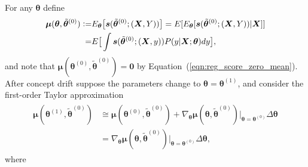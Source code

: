 \documentclass[twoside,11pt]{article}
\begin{document}
For any $\bm { \theta}$ define 
\begin{align}
\begin{aligned}
\bm{\mu}(\bm { \theta}, \tilde{ \bm { \theta}} ^{ (0)}) \vcentcolon=& E _{\bm { \theta}} \big[ \bm{s} (\tilde{ \bm { \theta}} ^{ (0)}; (\bm{X},Y) ) \big] = E[E _{\bm { \theta}}[\bm{s}(\tilde{\bm { \theta}}^{ (0)}; (\bm {X}, Y))| \bm {X}] ] \\
=& E\big[\int \bm{s}(\tilde{\bm { \theta}}^{ (0)}; (\bm {X}, y)) P(y | \bm {X}; \bm{\theta}) dy \big], 
\end{aligned}
\label{eqn:mu_def}
\end{align}
and note that $\bm{\mu}(\bm { \theta}^{(0)}, \tilde{ \bm { \theta}} ^{ (0)}) = \bm{0}$ by Equation~(\ref{eqn:reg_score_zero_mean}). After concept drift suppose the parameters change to $\bm { \theta} = \bm { \theta}^{(1)}$, and consider the first-order Taylor approximation 
\begin{align}
\begin{aligned}
\bm{\mu}(\bm { \theta} ^{ (1)}, \tilde{ \bm { \theta}} ^{ (0)}) & \cong \bm{\mu}(\bm { \theta} ^{ (0)}, \tilde{ \bm { \theta}} ^{ (0)}) + \nabla_{\bm{\theta}} \bm{\mu}(\bm { \theta}, \tilde{ \bm { \theta}} ^{ (0)})|_{\bm{\theta} = \bm{\theta}^{(0)}} \Delta \bm { \theta}  \\
&= \nabla_{\bm{\theta}} \bm{\mu}(\bm { \theta}, \tilde{ \bm { \theta}} ^{ (0)})|_{\bm{\theta} = \bm{\theta}^{(0)}} \Delta \bm { \theta}, 
\end{aligned}
\label{eqn:mu_approx}
\end{align}
where 
\end{document}
